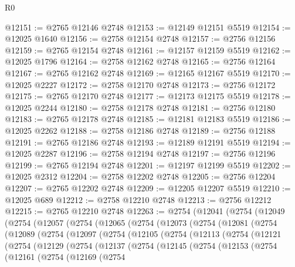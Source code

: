 \begin{lexlean}{R0}
\begin{coremodule}
@12151 := @2765 @12146 @2748
@12153 := @12149 @12151 @5519
@12154 := @12025 @1640
@12156 := @2758 @12154 @2748
@12157 := @2756 @12156
@12159 := @2765 @12154 @2748
@12161 := @12157 @12159 @5519
@12162 := @12025 @1796
@12164 := @2758 @12162 @2748
@12165 := @2756 @12164
@12167 := @2765 @12162 @2748
@12169 := @12165 @12167 @5519
@12170 := @12025 @2227
@12172 := @2758 @12170 @2748
@12173 := @2756 @12172
@12175 := @2765 @12170 @2748
@12177 := @12173 @12175 @5519
@12178 := @12025 @2244
@12180 := @2758 @12178 @2748
@12181 := @2756 @12180
@12183 := @2765 @12178 @2748
@12185 := @12181 @12183 @5519
@12186 := @12025 @2262
@12188 := @2758 @12186 @2748
@12189 := @2756 @12188
@12191 := @2765 @12186 @2748
@12193 := @12189 @12191 @5519
@12194 := @12025 @2287
@12196 := @2758 @12194 @2748
@12197 := @2756 @12196
@12199 := @2765 @12194 @2748
@12201 := @12197 @12199 @5519
@12202 := @12025 @2312
@12204 := @2758 @12202 @2748
@12205 := @2756 @12204
@12207 := @2765 @12202 @2748
@12209 := @12205 @12207 @5519
@12210 := @12025 @689
@12212 := @2758 @12210 @2748
@12213 := @2756 @12212
@12215 := @2765 @12210 @2748
@12263 := @2754
    (@12041
      (@2754
        (@12049
          (@2754
            (@12057
              (@2754
                (@12065
                  (@2754
                    (@12073
                      (@2754
                        (@12081
                          (@2754
                            (@12089
                              (@2754
                                (@12097
                                  (@2754
                                    (@12105
                                      (@2754
                                        (@12113
                                          (@2754
                                            (@12121
                                              (@2754
                                                (@12129
                                                  (@2754
                                                    (@12137
                                                      (@2754
                                                        (@12145
                                                          (@2754
                                                            (@12153
                                                              (@2754
                                                                (@12161
                                                                  (@2754
                                                                    (@12169
                                                                      (@2754

\end{coremodule}
\end{lexlean}
